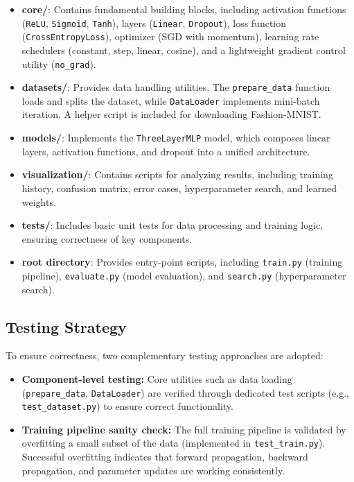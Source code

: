 \documentclass[11pt]{article}
\begin{document}
\begin{itemize}
    \item \textbf{core/}: Contains fundamental building blocks, including activation functions (\texttt{ReLU}, \texttt{Sigmoid}, \texttt{Tanh}), layers (\texttt{Linear}, \texttt{Dropout}), loss function (\texttt{CrossEntropyLoss}), optimizer (SGD with momentum), learning rate schedulers (constant, step, linear, cosine), and a lightweight gradient control utility (\texttt{no\_grad}).
    
    \item \textbf{datasets/}: Provides data handling utilities. The \texttt{prepare\_data} function loads and splits the dataset, while \texttt{DataLoader} implements mini-batch iteration. A helper script is included for downloading Fashion-MNIST.
    
    \item \textbf{models/}: Implements the \texttt{ThreeLayerMLP} model, which composes linear layers, activation functions, and dropout into a unified architecture.
    
    \item \textbf{visualization/}: Contains scripts for analyzing results, including training history, confusion matrix, error cases, hyperparameter search, and learned weights.
    
    \item \textbf{tests/}: Includes basic unit tests for data processing and training logic, ensuring correctness of key components.
    
    \item \textbf{root directory}: Provides entry-point scripts, including \texttt{train.py} (training pipeline), \texttt{evaluate.py} (model evaluation), and \texttt{search.py} (hyperparameter search).
\end{itemize}

\subsection{Testing Strategy}

To ensure correctness, two complementary testing approaches are adopted:

\begin{itemize}
    \item \textbf{Component-level testing:} Core utilities such as data loading (\texttt{prepare\_data}, \texttt{DataLoader}) are verified through dedicated test scripts (e.g., \texttt{test\_dataset.py}) to ensure correct functionality.

    \item \textbf{Training pipeline sanity check:} The full training pipeline is validated by overfitting a small subset of the data (implemented in \texttt{test\_train.py}). Successful overfitting indicates that forward propagation, backward propagation, and parameter updates are working consistently.
\end{itemize}
\end{document}
